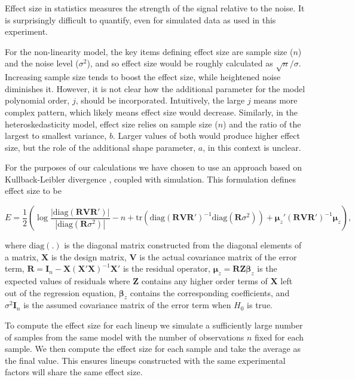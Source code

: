 \documentclass[]{interact}
\theoremstyle{plain}%
\theoremstyle{definition}
\theoremstyle{remark}
\begin{document}
Effect size in statistics measures the strength of the signal relative
to the noise. It is surprisingly difficult to quantify, even for
simulated data as used in this experiment.

For the non-linearity model, the key items defining effect size are
sample size (\(n\)) and the noise level (\(\sigma^2\)), and so effect
size would be roughly calculated as \(\sqrt{n}/{\sigma}\). Increasing
sample size tends to boost the effect size, while heightened noise
diminishes it. However, it is not clear how the additional parameter for
the model polynomial order, \(j\), should be incorporated. Intuitively,
the large \(j\) means more complex pattern, which likely means effect
size would decrease. Similarly, in the heteroskedasticity model, effect
size relies on sample size (\(n\)) and the ratio of the largest to
smallest variance, \(b\). Larger values of both would produce higher
effect size, but the role of the additional shape parameter, \(a\), in
this context is unclear.

For the purposes of our calculations we have chosen to use an approach
based on Kullback-Leibler divergence \citep{kullback1951information},
coupled with simulation. This formulation defines effect size to be

\vspace{-\baselineskip}

\[E = \frac{1}{2}\left(\log\frac{|\text{diag}(\boldsymbol{R}\boldsymbol{V}\boldsymbol{R}')|}{|\text{diag}(\boldsymbol{R}\sigma^2)|} - n + \text{tr}(\text{diag}(\boldsymbol{R}\boldsymbol{V}\boldsymbol{R}')^{-1}\text{diag}(\boldsymbol{R}\sigma^2)) + \boldsymbol{\mu}_z'(\boldsymbol{R}\boldsymbol{V}\boldsymbol{R}')^{-1}\boldsymbol{\mu}_z\right),\]

\noindent where \(\text{diag}(.)\) is the diagonal matrix constructed
from the diagonal elements of a matrix, \(\boldsymbol{X}\) is the design
matrix, \(\boldsymbol{V}\) is the actual covariance matrix of the error
term,
\(\boldsymbol{R} = \boldsymbol{I}_n - \boldsymbol{X}(\boldsymbol{X}'\boldsymbol{X})^{-1}\boldsymbol{X}'\)
is the residual operator,
\(\boldsymbol{\mu}_z = \boldsymbol{R}\boldsymbol{Z}\boldsymbol{\beta}_z\)
is the expected values of residuals where \(\boldsymbol{Z}\) contains
any higher order terms of \(\boldsymbol{X}\) left out of the regression
equation, \(\boldsymbol{\beta}_z\) contains the corresponding
coefficients, and \(\sigma^2\boldsymbol{I}_n\) is the assumed covariance
matrix of the error term when \(H_0\) is true.

To compute the effect size for each lineup we simulate a sufficiently
large number of samples from the same model with the number of
observations \(n\) fixed for each sample. We then compute the effect
size for each sample and take the average as the final value. This
ensures lineups constructed with the same experimental factors will
share the same effect size.
\end{document}
